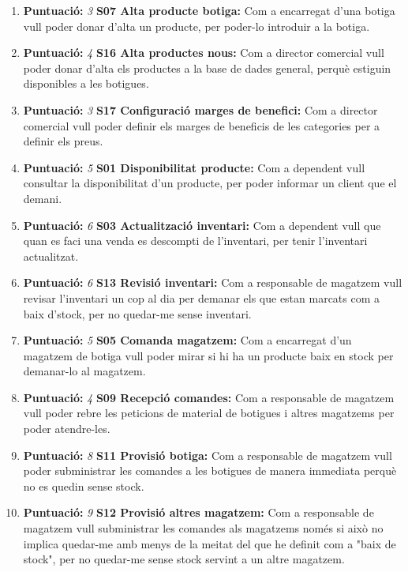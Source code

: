 \documentclass[a4paper,12pt]{article}
\begin{document}
\begin{enumerate}
	\item\textbf{Puntuació:} \textit{3} \textbf{S07 Alta producte botiga:} Com a encarregat d'una botiga vull poder donar d'alta un producte, per poder-lo introduir a la botiga.

	\item\textbf{Puntuació:} \textit{4} \textbf{S16 Alta productes nous:} Com a director comercial vull poder donar d'alta els productes a la base de dades general, perquè estiguin disponibles a les botigues.
	
	\item\textbf{Puntuació:} \textit{3} \textbf{S17 Configuració marges de benefici:} Com a director comercial vull poder definir els marges de beneficis de les categories per a definir els preus.
	
	\item\textbf{Puntuació:} \textit{5} \textbf{S01 Disponibilitat producte:} Com a dependent vull consultar la disponibilitat d'un producte, per poder informar un client que el demani.
	
	\item\textbf{Puntuació:} \textit{6} \textbf{S03 Actualització inventari:} Com a dependent vull que quan es faci una venda es descompti de l'inventari, per tenir l'inventari actualitzat.
	
	\item\textbf{Puntuació:} \textit{6} \textbf{S13 Revisió inventari:} Com a responsable de magatzem vull revisar l'inventari un cop al dia per demanar els que estan marcats com a baix d'stock, per no quedar-me sense inventari.
	
	\item\textbf{Puntuació:} \textit{5} \textbf{S05 Comanda magatzem:} Com a encarregat d'un magatzem de botiga vull poder mirar si hi ha un producte baix en stock per demanar-lo al magatzem.
	
	\item\textbf{Puntuació:} \textit{4} \textbf{S09 Recepció comandes:} Com a responsable de magatzem vull poder rebre les peticions de material de botigues i altres magatzems per poder atendre-les.
	
	\item\textbf{Puntuació:} \textit{8} \textbf{S11 Provisió botiga:} Com a responsable de magatzem vull poder subministrar les comandes a les botigues de manera immediata perquè no es quedin sense stock.
	
	\item\textbf{Puntuació:} \textit{9} \textbf{S12 Provisió altres magatzem:} Com a responsable de magatzem vull subministrar les comandes als magatzems només si això no implica quedar-me amb menys de la meitat del que he definit com a "baix de stock", per no quedar-me sense stock servint a un altre magatzem.
	

\end{enumerate}
\end{document}
